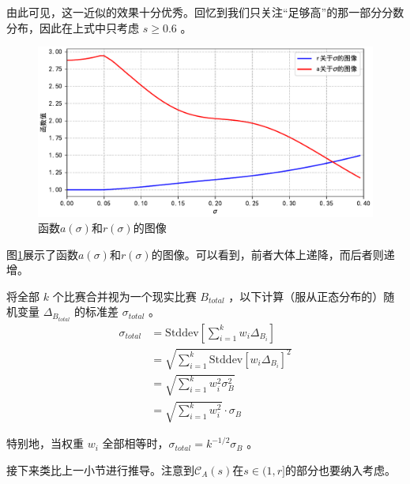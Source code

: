             由此可见，这一近似的效果十分优秀。回忆到我们只关注“足够高”的那一部分分数分布，因此在上式中只考虑 $s\geq 0.6$ 。

            \begin{figure}[htbp]
                \centering
                \includegraphics[width=\textwidth]{fig/plottingAandR.pdf}
                \caption{函数$a(\sigma)$和$r(\sigma)$的图像}
                \label{fig:plottingAandR}
            \end{figure}

            图\ref{fig:plottingAandR}展示了函数$a(\sigma)$和$r(\sigma)$的图像。可以看到，前者大体上递降，而后者则递增。

            \vspace{1.5ex}

            将全部 $k$ 个比赛合并视为一个现实比赛 $B_{\textit{total}}$ ，以下计算（服从正态分布的）随机变量 $\Delta_{B_{\textit{total}}}$ 的标准差 $\sigma_{\textit{total}}$ 。
            \begin{align*}
                \sigma_{\textit{total}}
                &=\mathrm{Stddev}\left[\sum\limits_{i=1}^k w_i\Delta_{B_i}\right] \\
                &=\sqrt{\sum\limits_{i=1}^k \mathrm{Stddev}\left[w_i\Delta_{B_i}\right]^2} \\
                &=\sqrt{\sum\limits_{i=1}^k w_i^2\sigma_B^2} \\
                &=\sqrt{\sum\limits_{i=1}^k w_i^2}\cdot\sigma_B
            \end{align*}

            特别地，当权重 $w_i$ 全部相等时，$\sigma_{\textit{total}}=k^{-1/2}\sigma_B$ 。

            \vspace{1.5ex}

            接下来类比上一小节进行推导。注意到$\mathcal{C}_A(s)$在$s\in (1,r]$的部分也要纳入考虑。

